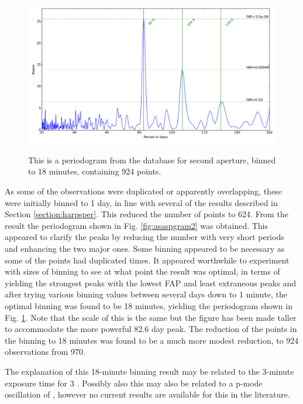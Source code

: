\begin{figure}[!htbp]
\begin{center}
\includegraphics[scale=0.30]{Figures/asasbin18min.png} \\
\end{center}
\caption{This is a periodogram from the {\asas} database for {\prox} second aperture, binned to 18 minutes, containing 924 points.}
\protect\label{fig:asaspgram3}
\end{figure}

As some of the observations were duplicated or apparently overlapping, these were initially binned to 1 day, in line
with several of the {\harps} results described in Section \ref{section:harpsper}. This reduced the number of points to
624. From the result the periodogram shown in Fig. \ref{fig:asaspgram2} was obtained. This appeared to clarify the peaks
by reducing the number with very short periods and enhancing the two major ones. Some binning appeared to be necessary
as some of the points had duplicated times. It appeared worthwhile to experiment with sizes of binning to see at what
point the result was optimal, in terms of yielding the strongest peaks with the lowest FAP and least extraneous peaks
and after trying various binning values between several days down to 1 minute, the optimal binning was found to be 18
minutes, yielding the periodogram shown in Fig. \ref{fig:asaspgram3}. Note that the scale of this is the same but the
figure has been made taller to accommodate the more powerful 82.6 day peak. The reduction of the points in the binning to
18 minutes was found to be a much more modest reduction, to 924 observations from 970.

The explanation of this 18-minute binning result may be related to the 3-minute exposure time for {\asas} 3
\citep{pojmanski01}. Possibly also this may also be related to a p-mode oscillation of \prox, however no current results
are available for this in the literature.

